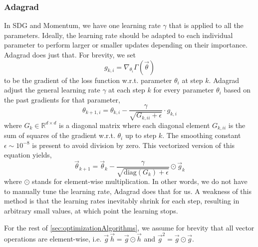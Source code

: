 \documentclass[twoside,english]{uiofysmaster}
\begin{document}
\subsubsection{Adagrad}
In SDG and Momentum, we have one learning rate $\gamma$ that is applied to all the parameters. 
Ideally, the learning rate should be adapted to each individual parameter to perform larger or smaller updates
depending on their importance. Adagrad \cite{Duchi11} does just that. For brevity, we set
\begin{equation}
 g_{k,i} = \nabla_{\theta_i} \Gamma (\vec{\theta})
\end{equation}
to be the gradient of the loss function w.r.t. parameter $\theta_i$ at step $k$. Adagrad adjust the general learning rate $\gamma$
at each step $k$ for every parameter $\theta_i$ based on the past gradients for that parameter,
\begin{equation}
 \theta_{k+1,i} = \theta_{k,i} - \frac{\gamma}{\sqrt{G_{k,ii} + \epsilon}} \cdot g_{k,i}
\end{equation}
where $G_k \in \mathbb{R}^{d \times d}$ is a diagonal matrix where each diagonal element $G_{k,ii}$ is the sum of squares
of the gradient w.r.t. $\theta_i$ up to step $k$. The smoothing constant $\epsilon \sim 10^{-8}$ is present to avoid
division by zero. This vectorized version of this equation yields,
\begin{equation}
  \vec{\theta}_{k+1} = \vec{\theta}_k - \frac{\gamma}{\sqrt{\mathrm{diag}(G_k) + \epsilon}} \odot \vec{g}_k
  \label{Adagrad}
\end{equation}
where $\odot$ stands for element-wise multiplication. In other words, we do not have to manually tune the learning rate, 
Adagrad does that for us. A weakness of this method is that the learning rates inevitably shrink for each step, 
resulting in arbitrary small values, at which point the learning stops.

For the rest of \autoref{sec:optimizationAlgorithms}, we assume for brevity that all vector operations are element-wise, i.e.
$\vec{g}\,\vec{h} = \vec{g} \odot \vec{h}$ and $\vec{g}^2 = \vec{g} \odot \vec{g}$.
\end{document}
